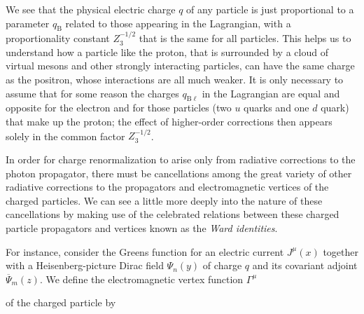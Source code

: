We see that the physical electric charge $q$ of any particle is just
proportional to a parameter $q_{\mathrm B}$ related to those appearing in the
Lagrangian, with a proportionality constant $Z_3^{-1/2}$ that is the same for
all particles. This helps us to understand how a particle like the proton,
that is surrounded by a cloud of virtual mesons and other strongly interacting
particles, can have the same charge as the positron, whose interactions are all
much weaker. It is only necessary to assume that for some reason the charges
$q_{\mathrm B\ell}$ in the Lagrangian are equal and opposite for the electron
and for those particles (two $u$ quarks and one $d$ quark) that make up the
proton; the effect of higher-order corrections then appears solely in the
common factor $Z_3^{-1/2}$.

In order for charge renormalization to arise only from radiative corrections
to the photon propagator, there must be cancellations among the great variety
of other radiative corrections to the propagators and electromagnetic vertices
of the charged particles. We can see a little more deeply into the nature of
these cancellations by making use of the celebrated relations between these
charged particle propagators and vertices known as the \emph{Ward identities}.

For instance, consider the Greens function for an electric current $J^\mu(x)$
together with a Heisenberg-picture Dirac field $\Psi_n(y)$ of charge $q$ and
its covariant adjoint $\overline\Psi_m(z)$. We define the electromagnetic
vertex function $\Gamma^\mu$



of the charged particle by

